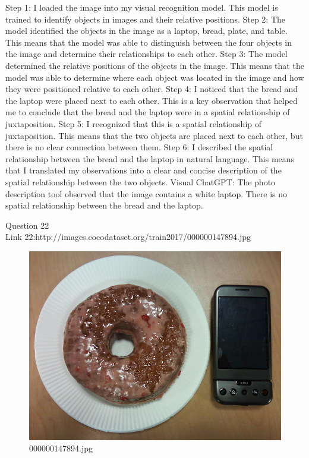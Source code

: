 \begin{enumerate}
        Step 1: I loaded the image into my visual recognition model. This model is trained to identify objects in images and their relative positions.
        Step 2: The model identified the objects in the image as a laptop, bread, plate, and table. This means that the model was able to distinguish between the four objects in the image and determine their relationships to each other.
        Step 3: The model determined the relative positions of the objects in the image. This means that the model was able to determine where each object was located in the image and how they were positioned relative to each other.
        Step 4: I noticed that the bread and the laptop were placed next to each other. This is a key observation that helped me to conclude that the bread and the laptop were in a spatial relationship of juxtaposition.
        Step 5: I recognized that this is a spatial relationship of juxtaposition. This means that the two objects are placed next to each other, but there is no clear connection between them.
        Step 6: I described the spatial relationship between the bread and the laptop in natural language. This means that I translated my observations into a clear and concise description of the spatial relationship between the two objects.
        \subitem Visual ChatGPT: The photo description tool observed that the image contains a white laptop. There is no spatial relationship between the bread and the laptop.
    \end{enumerate}
Question 22\\
Link 22:http://images.cocodataset.org/train2017/000000147894.jpg
    \begin{figure}[h]
        \centering
        \includegraphics[width=0.8\linewidth]{../image set/easy/000000147894.jpg}
        \caption{000000147894.jpg}
    \end{figure}
